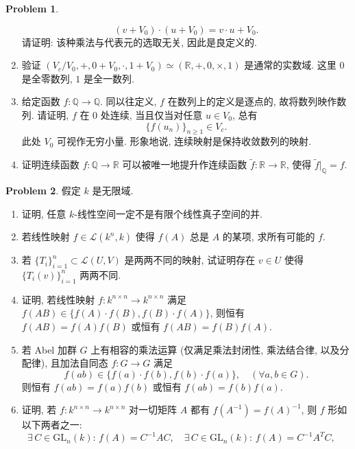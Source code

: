 \documentclass{MainStyle}
\theoremstyle{definition}
\newtheorem{problem}{Problem}
\begin{document}
\begin{problem}
\begin{enumerate}
\begin{equation}
              (v+V_0)\cdot (u+V_0)=v\cdot u+V_0.
          \end{equation}
          请证明: 该种乘法与代表元的选取无关, 因此是良定义的.
    \item 验证 $(V_c/V_0,+,0+V_0,\cdot,1+V_0)\simeq (\mathbb R,+,0,\times ,1)$ 是通常的实数域. 这里 $0$ 是全零数列, $1$ 是全一数列.
    \item 给定函数 $f:\mathbb Q\to \mathbb Q$. 同以往定义, $f$ 在数列上的定义是逐点的, 故将数列映作数列. 请证明, $f$ 在 $0$ 处连续, 当且仅当对任意 $u\in V_0$, 总有
          \begin{equation}
              \{f(u_n)\}_{n\geq 1}\in V_c.
          \end{equation}
          此处 $V_0$ 可视作无穷小量. 形象地说, 连续映射是保持收敛数列的映射.
    \item 证明连续函数 $f:\mathbb Q\to \mathbb R$ 可以被唯一地提升作连续函数 $\widetilde f:\mathbb R\to \mathbb R$, 使得 $\widetilde f|_{\mathbb Q}=f$.
\end{enumerate}
\end{problem}

\begin{problem}
假定 $k$ 是无限域.
\begin{enumerate}
    \item 证明, 任意 $k$-线性空间一定不是有限个线性真子空间的并.
    \item 若线性映射 $f\in \mathcal L(k^n, k)$ 使得 $f(A)$ 总是 $A$ 的某项, 求所有可能的 $f$.
    \item 若 $\{T_i\}_{i=1}^n\subset \mathcal L(U,V)$ 是两两不同的映射, 试证明存在 $v\in U$ 使得 $\{T_i(v)\}_{i=1}^n$ 两两不同.
    \item 证明, 若线性映射 $f:k^{n\times n}\to k^{n\times n}$ 满足 $f(AB)\in \{f(A)\cdot f(B),f(B)\cdot f(A)\}$, 则恒有 $f(AB)=f(A)f(B)$ 或恒有 $f(AB)=f(B)f(A)$.
    \item 若 Abel 加群 $G$ 上有相容的乘法运算 (仅满足乘法封闭性, 乘法结合律, 以及分配律), 且加法自同态 $f:G\to G$ 满足
          \begin{equation}
              f(ab)\in \{f(a)\cdot f(b), f(b)\cdot f(a)\}, \quad (\forall a,b\in G).
          \end{equation}
          则恒有 $f(ab)=f(a)f(b)$ 或恒有 $f(ab)=f(b)f(a)$.
    \item 证明, 若 $f:k^{n\times n}\to k^{n\times n}$ 对一切矩阵 $A$ 都有 $f(A^{-1})=f(A)^{-1}$, 则 $f$ 形如以下两者之一:
          \begin{equation}
              \exists \,C\in \mathrm{GL}_n(k):\,f(A)= C^{-1}AC,\quad \exists \,C\in \mathrm{GL}_n(k):\,f(A)= C^{-1}A^TC,\quad
          \end{equation}
\end{enumerate}
\end{problem}
\end{document}
